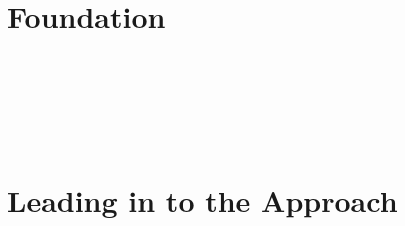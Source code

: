 \documentclass[12pt,oneside]{book}
\begin{document}
\newtheorem*{mydef}{Definition}






\newpage \ \newpage \ 
\part{Foundation}

%

\newpage\ 




\newpage\ 


\newpage\ \newpage\ 
\part{Leading in to the Approach}
\newpage\ 

\end{document}
